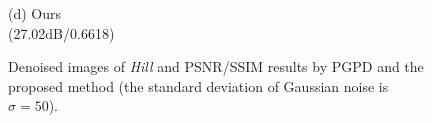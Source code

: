 \documentclass[runningheads]{llncs}
\begin{document}
\begin{figure}
{\begin{minipage}[t]{0.244\textwidth}
{\footnotesize (d) Ours \\(27.02dB/0.6618)}
\end{minipage}
}
\caption{Denoised images of \textsl{Hill} and PSNR/SSIM results by PGPD and the proposed method (the standard deviation of Gaussian noise is $\sigma=50$).}
\label{fig26}
\end{figure}

\begin{figure}
\centering
{}
\end{figure}
\end{document}
